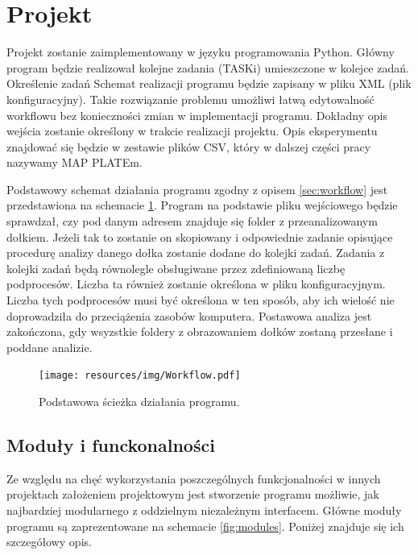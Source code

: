 \section{Projekt}

Projekt zostanie zaimplementowany w języku programowania Python. 
Główny program będzie  realizował kolejne zadania (TASKi) umieszczone w kolejce zadań. 
Określenie zadań 
Schemat realizacji programu będzie zapisany w pliku XML (plik konfiguracyjny). Takie rozwiązanie problemu umożliwi łatwą edytowalność workflowu bez konieczności zmian w implementacji programu. Dokładny opis wejścia zostanie określony w trakcie realizacji projektu.
Opis eksperymentu znajdować się będzie w zestawie plików CSV, który w dalszej części pracy nazywamy MAP PLATEm. 


Podstawowy schemat działania programu zgodny z opisem \ref{sec:workflow} jest przedstawiona na schemacie \ref{fig:workflow}. Program na podstawie pliku wejściowego będzie sprawdzał, czy pod danym adresem znajduje się folder z przeanalizowanym dołkiem. Jeżeli tak to zostanie on skopiowany i odpowiednie zadanie opisujące procedurę analizy danego dołka zostanie dodane do kolejki zadań. Zadania z kolejki zadań będą równolegle obsługiwane przez zdefiniowaną liczbę podprocesów. Liczba ta również zostanie określona w pliku konfiguracyjnym. Liczba tych podprocesów musi być określona w ten sposób, aby ich wielość nie doprowadziła do przeciążenia zasobów komputera.
Postawowa analiza jest zakończona, gdy wsyzstkie foldery z obrazowaniem dołków zostaną przesłane i poddane analizie.
 
\begin{figure}[htp]
  \begin{center}
    \texttt{[image: resources/img/Workflow.pdf]}
  \caption{Podstawowa ścieżka działania programu.  } 
  \label{fig:workflow}
  \end{center}
\end{figure}

\subsection{Moduły i funckonalności}

Ze względu na chęć wykorzystania poszczególnych funkcjonalności w innych projektach założeniem projektowym jest stworzenie programu możliwie, jak najbardziej modularnego z oddzielnym niezależnym interfacem. Główne moduły programu są zaprezentowane na schemacie \ref{fig:modules}.
Poniżej znajduje się ich szczegółowy opis.

